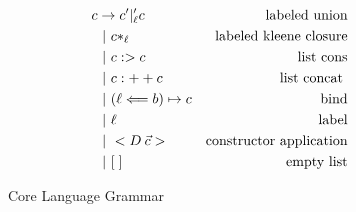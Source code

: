\begin{figure}\footnotesize
\begin{center}
    \begin{align*}
       c &\to c '|_{\ell}'c & \text{labeled union} \\
            &\ |\ c*_{\ell} & \text{labeled kleene closure} \\
            &\ |\ c :> c & \text{list cons} \\
            &\ |\ c :++ c & \text{list concat }\\
            &\ |\  (\ell \Longleftarrow b) \mapsto c & \text{bind} \\
            &\ |\  \ell & \text{label} \\        
            &\ |\  <D\>\vec{c}> & \text{constructor application} \\
            &\ |\  [\;] & \text{empty list} \\
    \end{align*}
\end{center}
    \caption{Core Language Grammar}
    \label{fig:the-core-language}
\end{figure}
